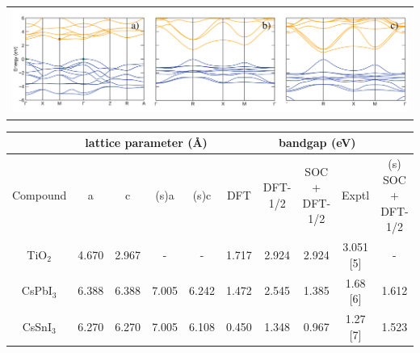 \documentclass[a0,portrait]{a0poster}
\begin{document}
\begin{multicols}{2}

\begin{center}
\begin{tabular}{c}
\includegraphics[scale=0.72]{allbands.png} \\
\end{tabular}
\end{center}
\vspace{-1cm}
\vspace{1cm}

\begin{center}
\begin{tabular*}{\columnwidth}{@{\extracolsep{\fill}}cccccccccc}
\toprule
 & \multicolumn{4}{c}{lattice parameter (\AA)} & \multicolumn{5}{c}{bandgap (eV)} \\
\midrule
Compound & a & c & (s)a & (s)c & DFT & DFT-1/2 & SOC + DFT-1/2 & Exptl & (s) SOC + DFT-1/2 \\
\midrule
TiO$_2$ & 4.670 & 2.967 & - & - & 1.717 & 2.924 & 2.924 & 3.051 [5] & -\\
CsPbI$_3$ & 6.388 & 6.388 & 7.005 & 6.242 & 1.472 & 2.545 & 1.385 & 1.68 [6] & 1.612 \\
CsSnI$_3$ & 6.270 & 6.270 & 7.005 & 6.108 & 0.450 & 1.348 & 0.967 & 1.27 [7] & 1.523 \\
\bottomrule
\end{tabular*}
\end{center}


\vspace{0.2cm}



\end{multicols}
\end{document}
